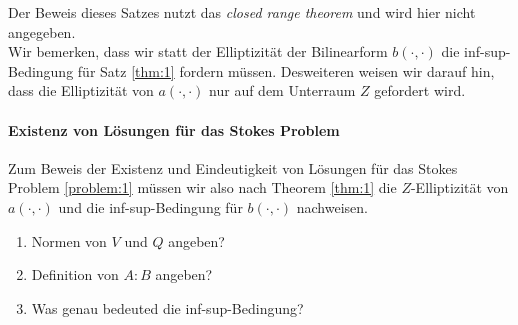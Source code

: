 \documentclass[a4paper]{scrartcl}
\theoremstyle{plain}
\theoremstyle{definition}
\theoremstyle{remark}
\begin{document}
\noindent Der Beweis dieses Satzes nutzt das \emph{closed range theorem} und
wird hier nicht angegeben. \\
Wir bemerken, dass wir statt der Elliptizität der Bilinearform \(b(\cdot,
\cdot)\) die inf-sup-Bedingung für Satz \ref{thm:1} fordern
müssen. Desweiteren weisen wir darauf hin, dass die Elliptizität von
\(a(\cdot, \cdot)\) nur auf dem Unterraum \(Z\) gefordert wird. \\


\paragraph{Existenz von Lösungen für das Stokes Problem}
\label{sec:exist-von-losung}

Zum Beweis der Existenz und Eindeutigkeit von Lösungen für das Stokes
Problem \ref{problem:1} müssen wir also nach Theorem \ref{thm:1} die
\(Z\)-Elliptizität von \(a(\cdot, \cdot)\) und die inf-sup-Bedingung
für \(b(\cdot, \cdot)\) nachweisen. \\





{\color{red}
  \begin{enumerate}
  \item Normen von \(V\) und \(Q\) angeben?
  \item Definition von \(A:B\) angeben?
  \item Was genau bedeuted die inf-sup-Bedingung?
  \end{enumerate}

}





\end{document}
